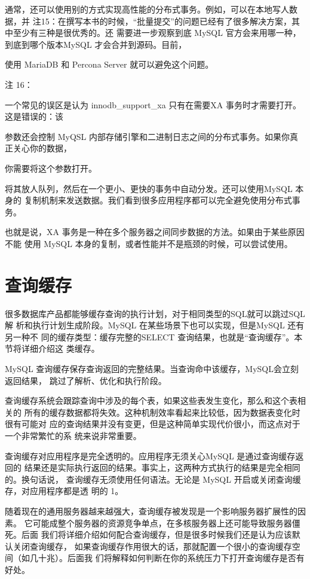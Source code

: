 通常，还可以使用别的方式实现高性能的分布式事务。例如，可以在本地写人数据，并
注15：在撰写本书的时候，“批量提交”的问题已经有了很多解决方案，其中至少有三种是很优秀的。还
需要进一步观察到底 MySQL 官方会来用哪一种，到底到哪个版本MySQL 才会合并到源码。目前，

使用 MariaDB 和 Percona Server 就可以避免这个问题。

注 16：

一个常见的误区是认为 innodb\_support\_xa 只有在需要XA 事务时才需要打开。这是错误的：该

参数还会控制 MyQSL 内部存储引擎和二进制日志之间的分布式事务。如果你真正关心你的数据，

你需要将这个参数打开。

将其放人队列，然后在一个更小、更快的事务中自动分发。还可以使用MySQL 本身的
复制机制来发送数据。我们看到很多应用程序都可以完全避免使用分布式事务。

也就是说，XA 事务是一种在多个服务器之间同步数据的方法。如果由于某些原因不能
使用 MySQL 本身的复制，或者性能并不是瓶颈的时候，可以尝试使用。

\section{查询缓存}
很多数据库产品都能够缓存查询的执行计划，对于相同类型的SQL就可以跳过SQL解
析和执行计划生成阶段。MySQL 在某些场景下也可以实现，但是MySQL 还有另一种不
同的缓存类型：缓存完整的SELECT 查询结果，也就是“查询缓存”。本节将详细介绍这
类缓存。

MySQL 查询缓存保存查询返回的完整结果。当查询命中该缓存，MySQL会立刻返回结果，
跳过了解析、优化和执行阶段。

查询缓存系统会跟踪查询中涉及的每个表，如果这些表发生变化，那么和这个表相关的
所有的缓存数据都将失效。这种机制效率看起来比较低，因为数据表变化时很有可能对
应的查询结果并没有变更，但是这种简单实现代价很小，而这点对于一个非常繁忙的系
统来说非常重要。

查询缓存对应用程序是完全透明的。应用程序无须关心MySQL 是通过查询缓存返回的
结果还是实际执行返回的结果。事实上，这两种方式执行的结果是完全相同的。换句话说，
查询缓存无须使用任何语法。无论是 MySQL 开启或关闭查询缓存，对应用程序都是透
明的 1。

随着现在的通用服务器越来越强大，查询缓存被发现是一个影响服务器扩展性的因素。
它可能成整个服务器的资源竞争单点，在多核服务器上还可能导致服务器僵死。后面
我们将详细介绍如何配合查询缓存，但是很多时候我们还是认为应该默认关闭查询缓存，
如果查询缓存作用很大的话，那就配置一个很小的查询缓存空间（如几十兆）。后面我
们将解释如何判断在你的系统压力下打开查询缓存是否有好处。

